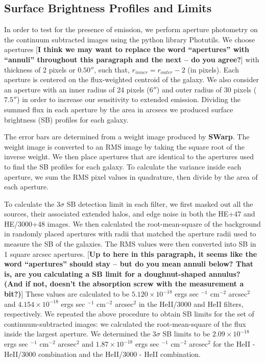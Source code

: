 \documentclass[twocolumn]{aastex6}
\begin{document}
\subsection{Surface Brightness Profiles and Limits}\label{subsec.sb}

In order to test for the presence of  emission, we perform aperture photometry on the continuum subtracted images using the python library Photutils. We choose apertures
[{\bf I think we may want to replace the word ``apertures'' with ``annuli'' throughout this paragraph and the next -- do you agree?}]
 with thickness of 2 pixels or $0.50 ''$, such that, $r_{inner}=r_{outer}-2$ (in pixels). Each aperture is centered on the flux-weighted centroid of the galaxy. We also consider an aperture with an inner radius of 24 pixels ($6''$) and outer radius of 30 pixels ($7.5''$) in order to increase our sensitivity to extended emission. Dividing the summed flux in each aperture by the area in arcsecs we produced surface brightness (SB) profiles for each galaxy. 

The error bars are determined from a weight image produced by \textbf{SWarp}. The weight image is converted to an RMS image by taking the square root of the inverse weight. We then place apertures that are identical to the apertures used to find the SB profiles for each galaxy. To calculate the variance inside each aperture, we sum the RMS pixel values in quadrature, then divide by the area of each aperture. 

To calculate the $3\sigma$ SB detection limit in each filter, we first masked out all the sources, their associated extended halos, and edge noise in both the HE+47 and HE/3000+48 images. We then calculated the root-mean-square of the background in randomly placed apertures with radii that matched the aperture radii used to measure the SB of the galaxies. The RMS values were then converted into SB in 1 square arcsec apertures. 
[{\bf Up to here in this paragraph, it seems like the word ``apertures'' should stay -- but do you mean annuli below?  That is, are you calculating a SB limit for a doughnut-shaped annulus?  (And if not, doesn't the absorption screw with the measurement a bit?)}]
These values are calculated to be $5.120\times10^{-18}$ ergs sec $^{-1}$ cm$^{-2}$ arcsec$^2$ and $4.154\times10^{-18} $ ergs sec $^{-1}$ cm$^{-2}$ arcsec$^2$ in the HeII/3000 and HeII filters, respectively. We repeated the above procedure to obtain SB limits for the set of continuum-subtracted images: we calculated the root-mean-square of the flux inside the largest aperture. We determined the 3$\sigma$ SB limits to be $2.09\times10^{-18}$ergs sec $^{-1}$ cm$^{-2}$ arcsec$^2$ and $1.87\times10^{-18}$ ergs sec $^{-1}$ cm$^{-2}$ arcsec$^2$ for the HeII - HeII/3000 combination and the HeII/3000 - HeII combination. 
\end{document}
